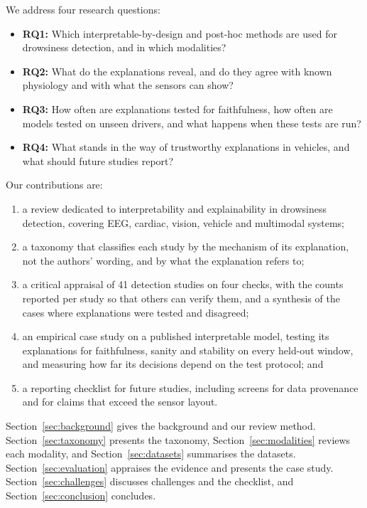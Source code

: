 We address four research questions:
\begin{itemize}
\item \textbf{RQ1:} Which interpretable-by-design and post-hoc methods are used for drowsiness detection, and in which modalities?
\item \textbf{RQ2:} What do the explanations reveal, and do they agree with known physiology and with what the sensors can show?
\item \textbf{RQ3:} How often are explanations tested for faithfulness, how often are models tested on unseen drivers, and what happens when these tests are run?
\item \textbf{RQ4:} What stands in the way of trustworthy explanations in vehicles, and what should future studies report?
\end{itemize}

Our contributions are:
\begin{enumerate}
\item a review dedicated to interpretability and explainability in drowsiness detection, covering EEG, cardiac, vision, vehicle and multimodal systems;
\item a taxonomy that classifies each study by the mechanism of its explanation, not the authors' wording, and by what the explanation refers to;
\item a critical appraisal of 41 detection studies on four checks, with the counts reported per study so that others can verify them, and a synthesis of the cases where explanations were tested and disagreed;
\item an empirical case study on a published interpretable model, testing its explanations for faithfulness, sanity and stability on every held-out window, and measuring how far its decisions depend on the test protocol; and
\item a reporting checklist for future studies, including screens for data provenance and for claims that exceed the sensor layout.
\end{enumerate}

Section~\ref{sec:background} gives the background and our review method. Section~\ref{sec:taxonomy} presents the taxonomy, Section~\ref{sec:modalities} reviews each modality, and Section~\ref{sec:datasets} summarises the datasets. Section~\ref{sec:evaluation} appraises the evidence and presents the case study. Section~\ref{sec:challenges} discusses challenges and the checklist, and Section~\ref{sec:conclusion} concludes.
